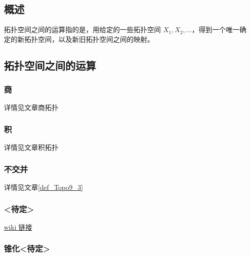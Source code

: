 
\begin{issues}
\issueDraft
\issueTODO
\issueMissDepend
\issueAbstract
\issueNeedCite
\end{issues}

\subsection{概述}

拓扑空间之间的运算指的是，用给定的一些拓扑空间 $X_1, X_2, \dots$，得到一个唯一确定的新拓扑空间，以及新旧拓扑空间之间的映射。


\subsection{拓扑空间之间的运算}

\subsubsection{商}

详情见文章商拓扑


\subsubsection{积}

详情见文章积拓扑


\subsubsection{不交并}

详情见文章\autoref{def_Topo9_3}~


\subsubsection{<待定>}

\href{https://en.m.wikipedia.org/wiki/Join_(topology)}{wiki 链接}


\subsubsection{锥化<待定>}

